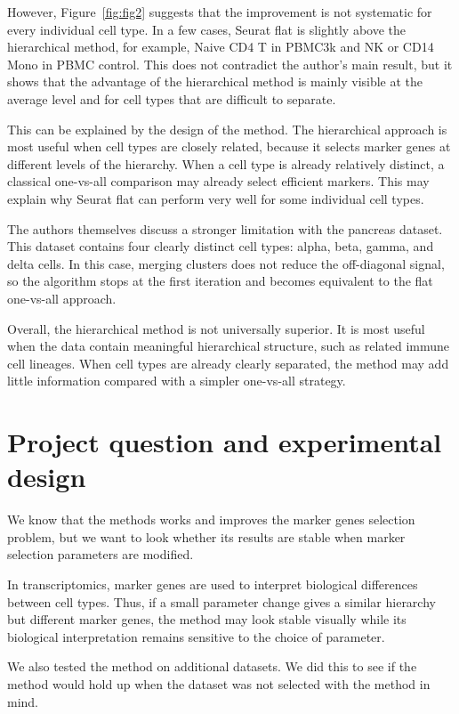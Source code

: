 \documentclass[11pt,a4paper]{article}
\begin{document}
However, Figure~\ref{fig:fig2} suggests that the improvement is not systematic for every individual cell type.
In a few cases, Seurat flat is slightly above the hierarchical method, for example, Naive CD4 T in PBMC3k and NK or CD14 Mono in PBMC control.
This does not contradict the author's main result, but it shows that the advantage of the hierarchical method is mainly visible at the average level and for cell types that are difficult to separate.

This can be explained by the design of the method.
The hierarchical approach is most useful when cell types are closely related, because it selects marker genes at different levels of the hierarchy.
When a cell type is already relatively distinct, a classical one-vs-all comparison may already select efficient markers.
This may explain why Seurat flat can perform very well for some individual cell types.

The authors themselves discuss a stronger limitation with the pancreas dataset.
This dataset contains four clearly distinct cell types: alpha, beta, gamma, and delta cells.
In this case, merging clusters does not reduce the off-diagonal signal, so the algorithm stops at the first iteration and becomes equivalent to the flat one-vs-all approach.

Overall, the hierarchical method is not universally superior.
It is most useful when the data contain meaningful hierarchical structure, such as related immune cell lineages.
When cell types are already clearly separated, the method may add little information compared with a simpler one-vs-all strategy.


\section{Project question and experimental design}

We know that the methods works and improves the marker genes selection problem, but we want to look whether its results are stable when marker selection parameters are modified.

In transcriptomics, marker genes are used to interpret biological differences between cell types.
Thus, if a small parameter change gives a similar hierarchy but different marker genes, the method may look stable visually while its biological interpretation remains sensitive to the choice of parameter.

We also tested the method on additional datasets.
We did this to see if the method would hold up when the dataset was not selected with the method in mind.
\end{document}
